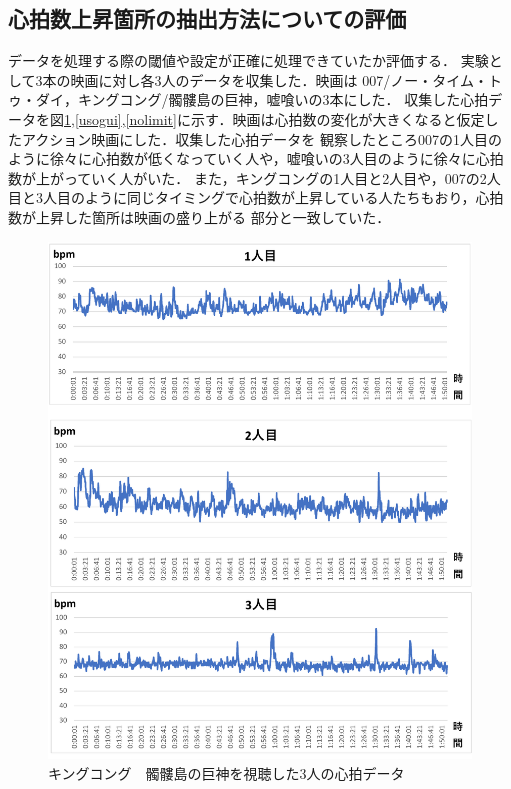 \subsection{心拍数上昇箇所の抽出方法についての評価}
データを処理する際の閾値や設定が正確に処理できていたか評価する．
実験として3本の映画に対し各3人のデータを収集した．映画は 007/ノー・タイム・トゥ・ダイ，キングコング/髑髏島の巨神，嘘喰いの3本にした．
収集した心拍データを図\ref{king},\ref{usogui},\ref{nolimit}に示す．映画は心拍数の変化が大きくなると仮定したアクション映画にした．収集した心拍データを
観察したところ007の1人目のように徐々に心拍数が低くなっていく人や，嘘喰いの3人目のように徐々に心拍数が上がっていく人がいた．
また，キングコングの1人目と2人目や，007の2人目と3人目のように同じタイミングで心拍数が上昇している人たちもおり，心拍数が上昇した箇所は映画の盛り上がる
部分と一致していた．
\begin{figure}[H]
    \centering
    \includegraphics[width=14cm]{images/chapter4/kingkong2.pdf}
    \caption{キングコング　髑髏島の巨神を視聴した3人の心拍データ}
    \label{king}
\end{figure}

